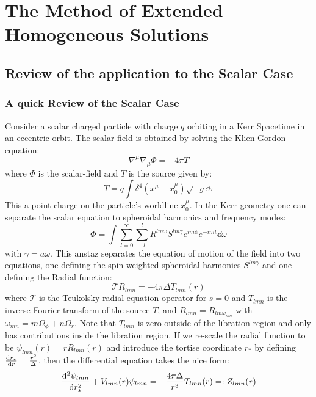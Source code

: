 \documentclass[preprint,showpacs,preprintnumbers,amssymb,superscriptaddress,aps,prd,nofootinbib,11pt]{revtex4-1}
\begin{document}
\section{The Method of Extended Homogeneous Solutions}
\subsection{Review of the application to the Scalar Case \cite{Warburton_2011}}
\subsubsection{A quick Review of the Scalar Case}
Consider a scalar charged particle with charge $q$ orbiting in a Kerr Spacetime in an eccentric orbit. The scalar field is obtained by solving the Klien-Gordon equation:
\begin{equation}
    \nabla^\mu \nabla_\mu \Phi = - 4\pi T
\end{equation}
where $\Phi$ is the scalar-field and $T$ is the source given by:
\begin{equation}
    T = q \int \delta^4(x^\mu - x_0^\mu) \sqrt{-g} \dd \tau
\end{equation}
This a point charge on the particle's worldline $x_0^\mu$. In the Kerr geometry one can separate the scalar equation to spheroidal harmonics and frequency modes:
\begin{equation}
    \Phi = \int \sum\limits_{l=0}^\infty \sum \limits_{-l}^{l} R^{lm\omega} S^{lm\gamma} e^{im\phi} e^{-imt} \dd \omega
\end{equation}
with $\gamma = a \omega$. This anstaz separates the equation of motion of the field into two equations, one defining the spin-weighted spheroidal harmonics $S^{lm\gamma}$ and one defining the Radial function:
\begin{equation}
    \mathcal{T} R_{lmn} = -4\pi \Delta T_{lmn}(r)
\end{equation}
where $\mathcal{T}$ is the Teukolsky radial equation operator for $s=0$ and $T_{lmn}$ is the inverse Fourier transform of the source $T$, and $R_{lmn} = R_{lm \omega_{mn}}$ with $\omega_{mn} = m \Omega_\phi + n \Omega_r$. Note that $T_{lmn}$ is zero outside of the libration region and only has contributions inside the libration region. If we re-scale the radial function to be $\psi_{lmn} (r) = r R_{lmn}(r)$ and introduce the tortise coordinate $r_*$ by defining $\dv{r_*}{r} = \frac{r^2}{\Delta}$, then the differential equation takes the nice form:
 \begin{equation}
     \dv[2]{\psi_{lmn}}{r_*}  + V_{lmn} (r)\psi_{lmn} = -\frac{4\pi \Delta}{r^3} T_{lmn}(r) =: Z_{lmn}(r) \label{eqn:radialEquation}
 \end{equation}
\end{document}
